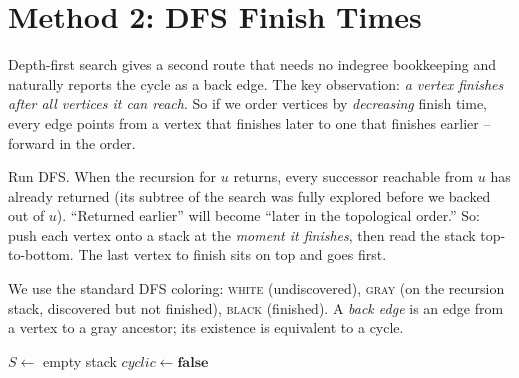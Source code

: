 \section{Method 2: DFS Finish Times}

Depth-first search gives a second route that needs no indegree bookkeeping and naturally reports the
cycle as a back edge. The key observation: \emph{a vertex finishes after all vertices it can
reach}. So if we order vertices by \emph{decreasing} finish time, every edge points from a
vertex that finishes later to one that finishes earlier -- forward in the order.

\begin{intuitionbox}
Run DFS. When the recursion for $u$ returns, every successor reachable from $u$ has already returned
(its subtree of the search was fully explored before we backed out of $u$). ``Returned earlier'' will
become ``later in the topological order.'' So: push each vertex onto a stack at the \emph{moment it
finishes}, then read the stack top-to-bottom. The last vertex to finish sits on top and goes first.
\end{intuitionbox}

We use the standard DFS coloring: \textsc{white} (undiscovered), \textsc{gray} (on the recursion
stack, discovered but not finished), \textsc{black} (finished). A \emph{back edge} is an edge from a
vertex to a gray ancestor; its existence is equivalent to a cycle.

\begin{algorithm}[H]
\DontPrintSemicolon
{}
$S\gets$ empty stack\; \quad $\mathit{cyclic}\gets \textbf{false}$\;
\BlankLine
{}
\caption{\textsc{DFSTopoSort}$(\Gph)$}\label{ch04:dfs-algo}
\end{algorithm}

